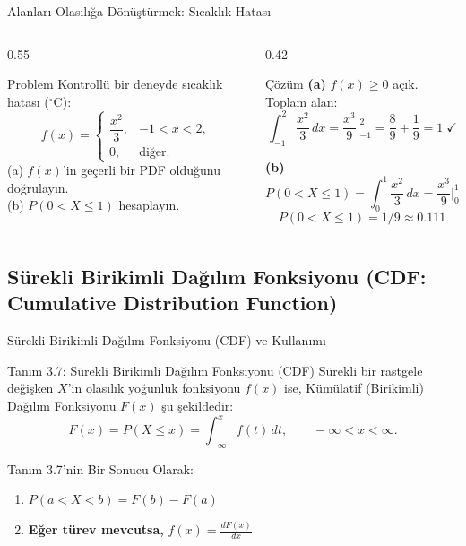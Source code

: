 ﻿\documentclass[light]{lutbeamer}
\begin{document}
\begin{frame}{Alanları Olasılığa Dönüştürmek: Sıcaklık Hatası}
\footnotesize
\begin{columns}[T]
  \begin{column}{0.55\textwidth}
    \begin{block}{Problem}
      Kontrollü bir deneyde sıcaklık hatası ($^\circ$C):
      \[
      f(x) =
      \begin{cases}
        \dfrac{x^2}{3}, & -1 < x < 2,\\[4pt]
        0, & \text{diğer}.
      \end{cases}
      \]
      (a) $f(x)$'in geçerli bir PDF olduğunu doğrulayın.\\
      (b) $P(0 < X \le 1)$ hesaplayın.
    \end{block}
  \end{column}
  \begin{column}{0.42\textwidth}
    \begin{alertblock}{Çözüm}
      \textbf{(a)} $f(x) \ge 0$ açık. Toplam alan:
      \[
      \int_{-1}^{2} \frac{x^2}{3}\,dx = \frac{x^3}{9}\bigg|_{-1}^{2} = \frac{8}{9} + \frac{1}{9} = 1 \;\checkmark
      \]

      \textbf{(b)}
      \[
      P(0 < X \le 1) = \int_{0}^{1} \frac{x^2}{3}\,dx = \frac{x^3}{9}\bigg|_{0}^{1} = \frac{1}{9}
      \]
      \[
      \boxed{P(0 < X \le 1) = 1/9 \approx 0.111}
      \]
    \end{alertblock}
  \end{column}
\end{columns}
\end{frame}

\subsection{Sürekli Birikimli Dağılım Fonksiyonu (CDF: Cumulative Distribution Function)}

\begin{frame}{Sürekli Birikimli Dağılım Fonksiyonu (CDF) ve Kullanımı}
\begin{block}{Tanım 3.7: Sürekli Birikimli Dağılım Fonksiyonu (CDF)}
  Sürekli bir rastgele değişken $X$'in olasılık yoğunluk fonksiyonu $f(x)$ ise, Kümülatif (Birikimli) Dağılım Fonksiyonu $F(x)$ şu şekildedir:
  \[
  F(x) = P(X \le x) = \int_{-\infty}^{x} f(t)\,dt, \qquad -\infty < x < \infty.
  \]
\end{block}

\begin{block}{Tanım 3.7'nin Bir Sonucu Olarak:}
  \begin{enumerate}
    \item $P(a < X < b) = F(b) - F(a)$
    \item \textbf{Eğer türev mevcutsa,} $f(x) = \frac{dF(x)}{dx}$
  \end{enumerate}
\end{block}
\end{frame}
\end{document}

